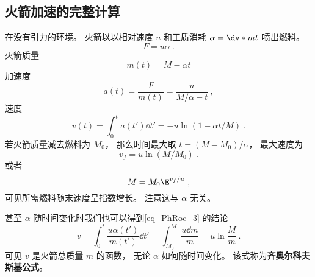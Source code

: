 \subsection{火箭加速的完整计算}
在没有引力的环境。 火箭以以相对速度 $u$ 和工质消耗 $\alpha = \dv*{m}{t}$  喷出燃料。
\begin{equation}
F = u\alpha~.
\end{equation}
火箭质量
\begin{equation}
m(t) = M - \alpha t
\end{equation}
加速度
\begin{equation}
a(t) = \frac{F}{m(t)} = \frac{u}{M/\alpha - t}~,
\end{equation}
速度
\begin{equation}
v(t) = \int_0^t a(t') \dd{t'} = -u \ln(1 - \alpha t / M)~.
\end{equation}
若火箭质量减去燃料为 $M_0$， 那么时间最大取 $t = (M - M_0)/\alpha$， 最大速度为
\begin{equation}
v_f = u \ln(M / M_0)~.
\end{equation}
或者
\begin{equation}\label{eq_PhRoc_3}
M = M_0\E^{v_f/u}~,
\end{equation}
可见所需燃料随末速度呈指数增长。 注意这与 $\alpha$ 无关。

甚至 $\alpha$ 随时间变化时我们也可以得到\autoref{eq_PhRoc_3} 的结论
\begin{equation}
v = \int_0^t \frac{u\alpha(t')}{m(t')}\dd{t'} = \int_{M_0}^M \frac{u\dd{m}}{m} = u\ln{\frac{M}{m}}~.
\end{equation}
可见 $v$ 是火箭总质量 $m$ 的函数， 无论 $\alpha$ 如何随时间变化。 该式称为\textbf{齐奥尔科夫斯基公式}。
